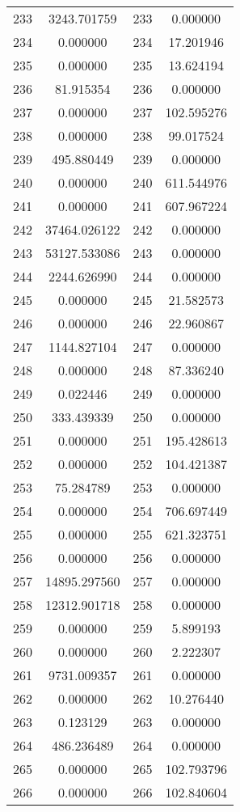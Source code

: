 \documentclass[12pt]{article}
\begin{document}
\begin{longtable}{@{}cccc@{}}
233 & 3243.701759 & 233 & 0.000000 \\
234 & 0.000000 & 234 & 17.201946 \\
235 & 0.000000 & 235 & 13.624194 \\
236 & 81.915354 & 236 & 0.000000 \\
237 & 0.000000 & 237 & 102.595276 \\
238 & 0.000000 & 238 & 99.017524 \\
239 & 495.880449 & 239 & 0.000000 \\
240 & 0.000000 & 240 & 611.544976 \\
241 & 0.000000 & 241 & 607.967224 \\
242 & 37464.026122 & 242 & 0.000000 \\
243 & 53127.533086 & 243 & 0.000000 \\
244 & 2244.626990 & 244 & 0.000000 \\
245 & 0.000000 & 245 & 21.582573 \\
246 & 0.000000 & 246 & 22.960867 \\
247 & 1144.827104 & 247 & 0.000000 \\
248 & 0.000000 & 248 & 87.336240 \\
249 & 0.022446 & 249 & 0.000000 \\
250 & 333.439339 & 250 & 0.000000 \\
251 & 0.000000 & 251 & 195.428613 \\
252 & 0.000000 & 252 & 104.421387 \\
253 & 75.284789 & 253 & 0.000000 \\
254 & 0.000000 & 254 & 706.697449 \\
255 & 0.000000 & 255 & 621.323751 \\
256 & 0.000000 & 256 & 0.000000 \\
257 & 14895.297560 & 257 & 0.000000 \\
258 & 12312.901718 & 258 & 0.000000 \\
259 & 0.000000 & 259 & 5.899193 \\
260 & 0.000000 & 260 & 2.222307 \\
261 & 9731.009357 & 261 & 0.000000 \\
262 & 0.000000 & 262 & 10.276440 \\
263 & 0.123129 & 263 & 0.000000 \\
264 & 486.236489 & 264 & 0.000000 \\
265 & 0.000000 & 265 & 102.793796 \\
266 & 0.000000 & 266 & 102.840604 \\

\end{longtable}
\end{document}
